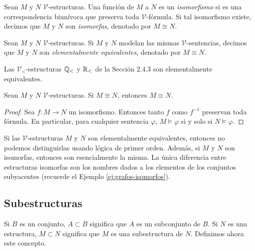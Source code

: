 \message{ !name(main.tex)}\documentclass[12pt,a4paper]{book}
\newcommand{\VV}{\mathcal{V}}
\begin{document}
    \begin{definicion}[Isomorfismo]\label{def:isomorfismo-estructuras}
        Sean $M$ y $N$ $\VV$-estructuras. Una función de $M$ a $N$ es un \textit{isomorfismo} si es una correspondencia
        biunívoca que preserva toda $\VV$-fórmula. Si tal isomorfismo existe, decimos que $M$ y $N$ son \textit{isomorfas},
        denotado por $M\cong N$.
    \end{definicion}

    \begin{definicion}\label{def:equivalencia-elemental}
        Sean $M$ y $N$ $\VV$-estructuras. Si $M$ y $N$ modelan las mismas $\VV$-sentencias, decimos que $M$ y $N$ son
        \textit{elementalmente equivalentes}, denotado por $M\equiv N$.
    \end{definicion}

    \begin{ejemplo}
        Las $\VV_{<}$-estructuras $\mathbb{Q}_{<}$ y $\mathbb{R}_{<}$ de la Sección 2.4.3 son elementalmente equivalentes.
    \end{ejemplo}

    \begin{proposicion}\label{prop:isomorfo-implica-equivalente}
        Sean $M$ y $N$ $\VV$-estructuras. Si $M\cong N$, entonces $M\equiv N$.
    \end{proposicion}
    \begin{proof}
        Sea $f:M\rightarrow N$ un isomorfismo. Entonces tanto $f$ como $f^{-1}$ preservan toda fórmula. En particular, para
        cualquier sentencia $\varphi$, $M\models\varphi$ si y solo si $N\models\varphi$.
    \end{proof}

    Si las $\VV$-estructuras $M$ y $N$ son elementalmente equivalentes, entonces no podemos distinguirlas usando lógica de
    primer orden. Además, si $M$ y $N$ son isomorfas, entonces son esencialmente la misma. La única diferencia entre
    estructuras isomorfas son los nombres dados a los elementos de los conjuntos subyacentes (recuerde el Ejemplo
    \ref{ej:grafos-isomorfos}).

    \subsection{Subestructuras}

    Si $B$ es un conjunto, $A\subset B$ significa que $A$ es un subconjunto de $B$. Si $N$ es una estructura, $M\subset N$
    significa que $M$ es una subestructura de $N$. Definimos ahora este concepto.
\end{document}
